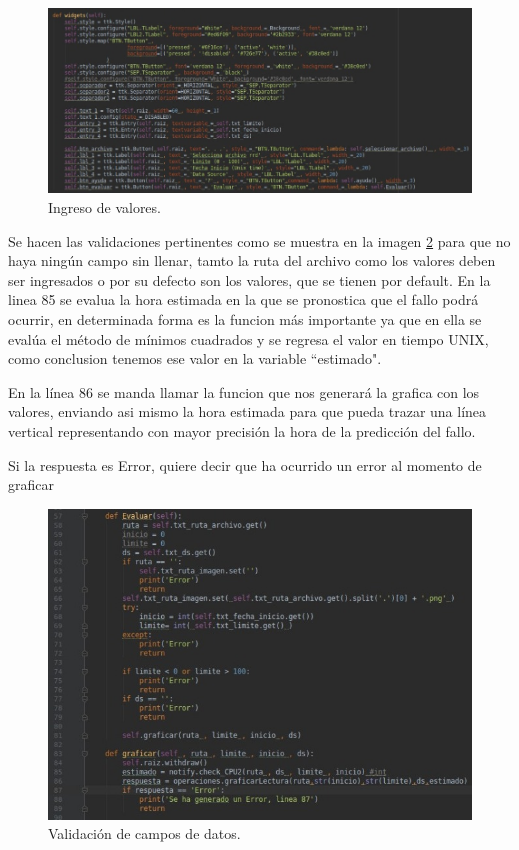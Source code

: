 \begin{itemize}
\FloatBarrier
\begin{figure}[htbp!]
		\centering
		    \includegraphics[width=1 \textwidth]{../images/ap2.jpeg} 
		\caption{Ingreso de valores.}
		\label{image:ap2}
\end{figure}
\FloatBarrier

Se hacen las validaciones pertinentes como se muestra en la imagen \ref{image:ap1} para que no haya ningún campo sin llenar, tamto la ruta del archivo como los valores deben ser ingresados o por su defecto son los valores, que se tienen por default.
En la linea 85 se evalua la hora estimada en la que se pronostica que el fallo podrá ocurrir, en determinada forma es la funcion más importante ya que en ella se evalúa el método de mínimos cuadrados y se regresa el valor en tiempo UNIX, como conclusion tenemos ese valor en la variable ``estimado".

En la línea 86 se manda llamar la funcion que nos generará la grafica con los valores, enviando asi mismo la hora estimada para que pueda trazar una línea vertical representando con mayor precisión la hora de la predicción del fallo.

Si la respuesta es Error, quiere decir que ha ocurrido un error al momento de graficar
\FloatBarrier
\begin{figure}[htbp!]
		\centering
		    \includegraphics[width=.7 \textwidth]{../images/ap1.jpeg} 
		\caption{Validación de campos de datos.}
		\label{image:ap1}
\end{figure}
\FloatBarrier


\end{itemize}
